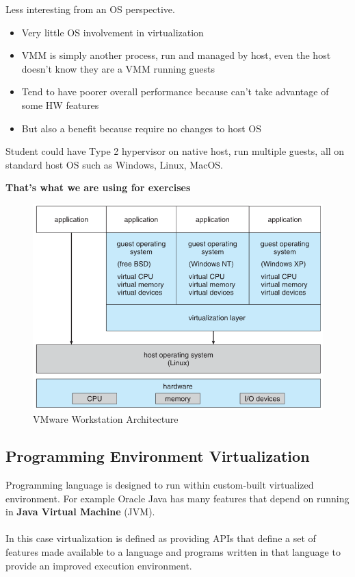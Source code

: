 Less interesting from an OS perspective.

\begin{itemize}
    \item Very little OS involvement in virtualization
    \item VMM is simply another process, run and managed by host, even the host doesn’t know they are a VMM running guests
    \item Tend to have poorer overall performance because can’t take advantage of some HW features
    \item But also a benefit because require no changes to host OS
\end{itemize}

Student could have Type 2 hypervisor on native host, run
multiple guests, all on standard host OS such as Windows,
Linux, MacOS.

\textbf{That’s what we are using for exercises}


\begin{figure}[h!]
    \centering
    \includegraphics[width=0.55\linewidth]{img/dfsvbdfsvb.png}
    \caption{VMware Workstation Architecture}
\end{figure}


\subsection{Programming Environment Virtualization}
Programming language is designed to run within custom-built
virtualized environment. For example Oracle Java has many features that depend on
running in \textbf{Java Virtual Machine} (JVM).
\paragraph{}

In this case virtualization is defined as providing APIs that define a set
of features made available to a language and programs written in that
language to provide an improved execution environment.

